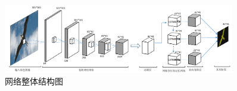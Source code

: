 \begin{figure}[h]
	\centering
	\includegraphics[width=0.9\textwidth,height=0.28\textwidth]{demo_images/illustration/networkstructure.pdf}
	\caption{网络整体结构图}
	\label{fig:networkstructure}
\end{figure}